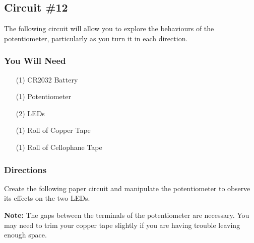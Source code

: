     \pagebreak
    \subsection{Circuit \#12}
    The following circuit will allow you to explore the behaviours of the potentiometer, particularly as you turn it in each direction.

    \subsubsection*{You Will Need}
    \begin{itemize}[noitemsep]
        \item[(1)] CR2032 Battery
        \item[(1)] Potentiometer
        \item[(2)] LEDs
        \item[(1)] Roll of Copper Tape
        \item[(1)] Roll of Cellophane Tape    
    \end{itemize}

    \subsubsection*{Directions}
    Create the following paper circuit and manipulate the potentiometer to observe its effects on the two LEDs.

    \medskip
    \textbf{Note:} The gaps between the terminals of the potentiometer are necessary. You may need to trim your copper tape slightly if you are having trouble leaving enough space.

